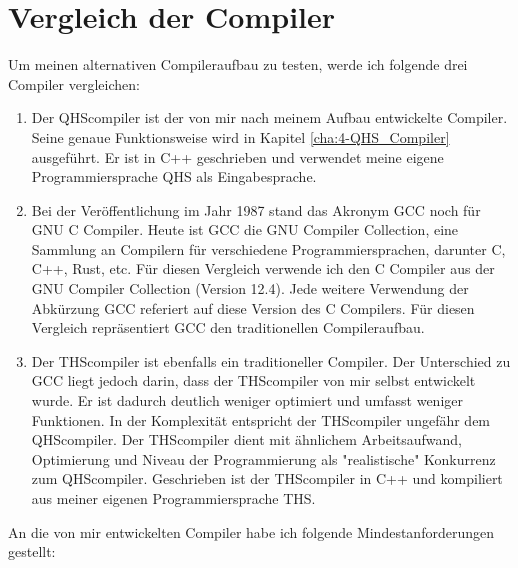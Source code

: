 \chapter{Vergleich der Compiler} \label{cha:2-Vergleich}
Um meinen alternativen Compileraufbau zu testen, werde ich folgende drei Compiler vergleichen:

\begin{enumerate}
\item
Der QHScompiler ist der von mir nach meinem Aufbau entwickelte Compiler. Seine genaue Funktionsweise wird in Kapitel \ref{cha:4-QHS_Compiler} ausgeführt.
Er ist in C++ geschrieben und verwendet meine eigene Programmiersprache QHS als Eingabesprache. 

\item
Bei der Veröffentlichung im Jahr 1987 stand das Akronym GCC noch für GNU C Compiler. Heute ist GCC die GNU Compiler Collection, eine Sammlung an Compilern für verschiedene Programmiersprachen, darunter C, C++, Rust, etc.
Für diesen Vergleich verwende ich den C Compiler aus der GNU Compiler Collection (Version 12.4).
Jede weitere Verwendung der Abkürzung GCC referiert auf diese Version des C Compilers.
Für diesen Vergleich repräsentiert GCC den traditionellen Compileraufbau.


\item
Der THScompiler ist ebenfalls ein traditioneller Compiler. Der Unterschied zu GCC liegt jedoch darin, dass der THScompiler von mir selbst entwickelt wurde. 
Er ist dadurch deutlich weniger optimiert und umfasst weniger Funktionen. In der Komplexität entspricht der THScompiler ungefähr dem QHScompiler.
Der THScompiler dient mit ähnlichem Arbeitsaufwand, Optimierung und Niveau der Programmierung als "realistische"{} Konkurrenz zum QHScompiler.
Geschrieben ist der THScompiler in C++ und kompiliert aus meiner eigenen Programmiersprache THS.
\end{enumerate}

An die von mir entwickelten Compiler habe ich folgende Mindestanforderungen gestellt:

